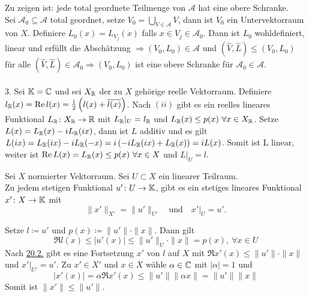 \begin{beweis}
	Zu zeigen ist: jede total geordnete Teilmenge von $\mathcal{A}$ hat eine obere Schranke. \\
	Sei $\mathcal{A}_{0}  \subseteq \mathcal{A}$ total geordnet, setze $V_{0} = \bigcup_{V \in \mathcal{A}} V$, dann ist $V_{0}$ ein Untervektorraum von $X$. Definiere $L_{0}(x) = L_{V_{j}}(x)$ falls $x \in V_{j} \in \mathcal{A}_{0}$. Dann ist $L_{0}$ wohldefiniert, linear und erfüllt die Abschätzung $\Rightarrow (V_{0}, L_{0}) \in \mathcal{A}$ und $(\hat{V}, \hat{L}) \leq (V_{0}, L_{0})$ für alle $(\hat{V}, \hat{L}) \in \mathcal{A}_{0} \Rightarrow (V_{0}, L_{0})$ ist eine obere Schranke für $\mathcal{A}_{0} \in \mathcal{A}$. \\ \\
	3. Sei $\mathbb{K} = \mathbb{C}$ und sei $X_{\mathbb{R}}$ der zu $X$ gehörige reelle Vektorraum. Definiere $l_{\mathbb{R}}(x) = \mathop{\rm Re}\nolimits l(x) = \frac{1}{2} \left( l(x) + \overline{l(x)} \right)$. Nach $(ii)$ gibt es ein reelles lineares Funktional $L_{\mathbb{R}} \colon X_{\mathbb{R}} \rightarrow \mathbb{R}$ mit $L_{\mathbb{R}}|_{U} = l_{\mathbb{R}}$ und $L_{\mathbb{R}}(x) \leq p(x) ~ \forall x \in X_{\mathbb{R}}$. Setze $L(x) = L_{\mathbb{R}}(x) - i L_{\mathbb{R}}(ix)$, dann ist $L$ additiv und es gilt $L(ix) = L_{\mathbb{R}}(ix) - i L_{\mathbb{R}}(-x) = i \left( - i L_{\mathbb{R}}(ix) + L_{\mathbb{R}}(x) \right) = i L(x)$. Somit ist L linear, weiter ist $\mathop{\rm Re}\nolimits L(x) = L_{\mathbb{R}}(x) \leq p(x) ~ \forall x \in X$ und $L|_{U} = l$.
\end{beweis}


\begin{satz} \label{satz:20.3-Hahn-Banach} 
	Sei $X$ normierter Vektorraum. Sei $U \subset X$ ein linearer Teilraum. \\
	Zu jedem stetigen Funktional $u' \colon U \rightarrow \mathbb{K}$, gibt es ein stetiges lineares Funktional $x' \colon X \rightarrow \mathbb{K}$ mit 
		\[ \| x' \|_{X'} = \| u' \|_{U'} \quad \text{und} \quad x'|_{U} = u'. \]	
\end{satz}

\begin{beweis}
	Setze $l \coloneqq u'$ und $p(x) \coloneqq \| u'\| \cdot \| x \|$. Dann gilt 
		\[ \Re l(x) \leq | u'(x) | \leq \| u' \|_{U} \cdot \| x \| = p(x), ~ \forall x \in U \]
	Nach \hyperref[satz:20.2-Hahn-Banach]{20.2.} gibt es eine Fortsetzung $x'$ von $l$ auf $X$ mit $\Re x'(x) \leq \| u' \| \cdot \| x \|$ und $x'|_{U'} = u'$.	Zu $x' \in X'$ und $x \in X$ wähle $\alpha \in \mathbb{C}$ mit $|\alpha| = 1$ und 
	\[ | x'(x) | = \alpha \Re x'(x) \leq \| u' \| \| \alpha x \| = \| u' \| \| x \|\]
	Somit ist $\| x' \| \leq \| u' \|$.
\end{beweis}


